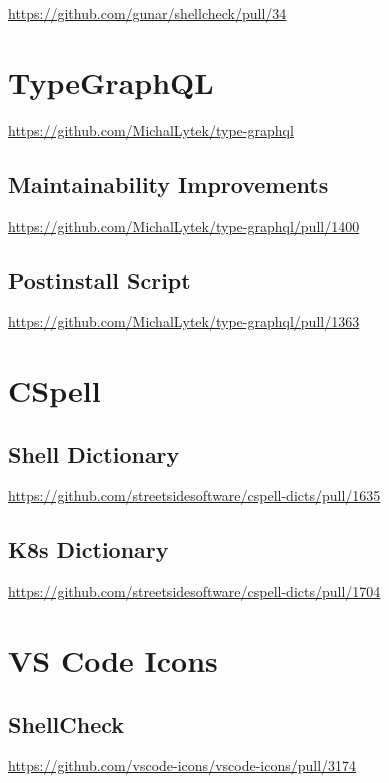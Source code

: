 \url{https://github.com/gunar/shellcheck/pull/34}

\section{TypeGraphQL}
\label{sec:upstream_contributions_typegraphql}

\url{https://github.com/MichalLytek/type-graphql}

\subsection{Maintainability Improvements}
\label{subsec:upstream_contributions_typegraphql_maintainability_improvements}

\url{https://github.com/MichalLytek/type-graphql/pull/1400}

\subsection{Postinstall Script}
\label{subsec:upstream_contributions_typegraphql_postinstall_script}

\url{https://github.com/MichalLytek/type-graphql/pull/1363}

\section{CSpell}
\label{sec:upstream_contributions_cspell}

\subsection{Shell Dictionary}
\label{subsec:upstream_contributions_cspell_shell_dictionary}

\url{https://github.com/streetsidesoftware/cspell-dicts/pull/1635}

\subsection{K8s Dictionary}
\label{subsec:upstream_contributions_cspell_k8s_dictionary}

\url{https://github.com/streetsidesoftware/cspell-dicts/pull/1704}

\section{VS Code Icons}
\label{sec:upstream_contributions_vscode_icons}

\subsection{ShellCheck}
\label{subsec:upstream_contributions_vscode_icons_shellcheck}

\url{https://github.com/vscode-icons/vscode-icons/pull/3174}